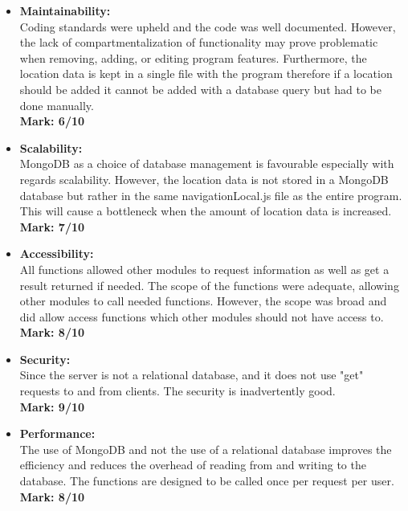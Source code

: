 \begin{itemize}
	
\item \textbf{Maintainability:}\\Coding standards were upheld and the code was well documented. However, the lack of compartmentalization of functionality may prove problematic when  removing, adding, or editing program features. Furthermore, the location data is kept in a single file with the program therefore if a location should be added it cannot be added with a database query but had to be done manually.\\
	\textbf{Mark: 6/10}
\item \textbf{Scalability:}\\MongoDB as a choice of database management is favourable especially with regards scalability. However, the location data is not stored in a MongoDB database but rather in the same navigationLocal.js file as the entire program. This will cause a bottleneck when the amount of location data is increased.\\
	\textbf{Mark: 7/10}
\item \textbf{Accessibility:}\\All functions allowed other modules to request information as well as get a result returned if needed. The scope of the functions were adequate, allowing other modules to call needed functions. However, the scope was broad and did allow access functions which other modules should not have access to.\\
	\textbf{Mark: 8/10}
\item \textbf{Security:}\\Since the server is not a relational database, and it does not use "get" requests to and from clients. The security is inadvertently good.\\
	\textbf{Mark: 9/10}
\item \textbf{Performance:}\\The use of MongoDB and not the use of a relational database improves the efficiency and reduces the overhead of reading from and writing to the database. The functions are designed to be called once per request per user. \\
	\textbf{Mark: 8/10}
	
\end{itemize}
